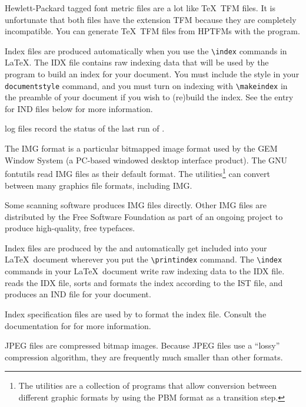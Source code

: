 \begin{iplist}{.25in}
\extitem [hptfm] Hewlett-Packard tagged font metric files are a lot like \TeX\
TFM files.  It is unfortunate that both files have the extension TFM
because they are completely incompatible.  You can generate \TeX\ TFM files
from HPTFMs with the \program{HPTFM2PL} program.

\extitem [idx] Index files are produced automatically when you use the
\verb|\index| commands in \LaTeX.  The IDX file contains raw indexing data
that will be used by the \program{MakeIndex} program to build an index for
your document.  You must include the \filename{makeidx} style in your
\verb|documentstyle| command, and you must turn on indexing with
\verb|\makeindex| in the preamble of your document if you wish to (re)build
the index.  See the entry for IND files below for more information.

\extitem [ilg]  log files record the status of the last run of
\program{MakeIndex}.

\extitem [img] The IMG format is a particular bitmapped image
format used by the GEM Window System (a PC-based windowed desktop
interface product).  The GNU fontutils read IMG files as their default
format. 
The  utilities\footnote{The
\program{PBMplus} utilities are a collection of programs that allow conversion between
different graphic formats by using the PBM format as a transition step.}
can convert between many graphics file formats, including IMG.

\newpage
Some scanning software produces IMG files directly.  Other IMG files
are distributed by the Free Software Foundation as part of an ongoing
project to produce high-quality, free typefaces.  

\extitem [ind] Index files are produced by the  and
automatically get included into your \LaTeX\ document wherever you
put the \verb|\printindex| command.  The \verb|\index| commands in your
\LaTeX\ document write raw indexing data to the IDX file.  
reads the IDX file, sorts and formats the index according to the IST file,
and produces an IND file for your document.  

\extitem [ist] Index specification files are used by  to 
format the index file.  Consult the documentation for \program{MakeIndex}
for more information.

\extitem [jpeg] JPEG files are compressed bitmap images.  Because JPEG files
use a ``lossy'' compression algorithm, they are frequently much smaller
than other formats.


\end{iplist}
